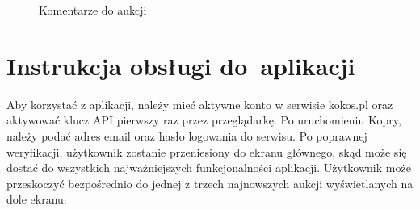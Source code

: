 \documentclass[a4paper,twoside,titlepage,openright]{book}
\begin{document}
\begin{figure}[ht!]
\begin{minipage}[t]{0.3\textwidth}
		\caption{Komentarze do aukcji}
		\label{fig:aukcjaKomentarze}
	\end{minipage}
\end{figure}

\newpage
\afterpage{\clearpage}
\section{Instrukcja obsługi do~aplikacji}
Aby korzystać z aplikacji, należy mieć aktywne konto w serwisie kokos.pl oraz aktywować klucz API pierwszy raz przez przeglądarkę. Po uruchomieniu Kopry, należy podać adres email oraz hasło logowania do serwisu. Po poprawnej weryfikacji, użytkownik zostanie przeniesiony do ekranu głównego, skąd może się dostać do wszystkich najważniejszych funkcjonalności aplikacji. Użytkownik może przeskoczyć bezpośrednio do jednej z trzech najnowszych aukcji wyświetlanych na dole ekranu.
\end{document}
